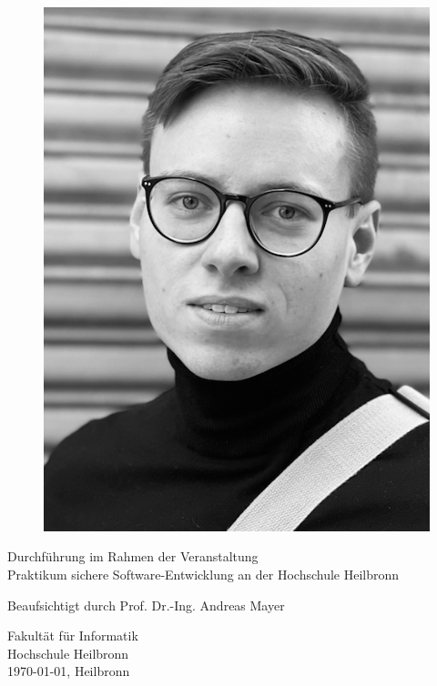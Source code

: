 \documentclass[10pt, a4paper,onecolumn ,titlepage]{article}
\begin{document}
\begin{titlepage}
\begin{center}
\begin{figure}[H]
\begin{minipage}[b]{.13\linewidth}
                    \includegraphics[width=\linewidth]{author_pictures/chris_2}
                \end{minipage}\label{fig:frederik}
            \end{figure}


            \vfill

            Durchführung im Rahmen der Veranstaltung \\ \glqq Praktikum sichere Software-Entwicklung\grqq{} an der Hochschule Heilbronn

            \vspace{0.2cm}

            Beaufsichtigt durch Prof. Dr.-Ing. Andreas Mayer

            \vspace{1.0cm}


            \vspace{0.8cm}

            Fakultät für Informatik\\
            Hochschule Heilbronn\\
            \today{}, Heilbronn

        \end{center}

    \end{titlepage}
\end{document}

